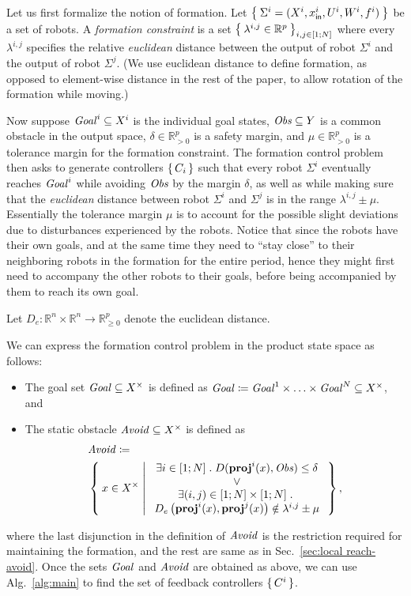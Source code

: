 Let us first formalize the notion of formation.
Let $\Set{\Sigma^i=(X^i,x_{\mathsf{in}}^i,U^i,W^i,f^i)}$ be a set of robots.
A \emph{formation constraint} is a set $\Set{\lambda^{i,j}\in \mathbb{R}^p}_{i,j\in [1;N]}$ where every $\lambda^{i,j}$ specifies the relative \emph{euclidean} distance between the output of robot $\Sigma^i$ and the output of robot $\Sigma^j$.
(We use euclidean distance to define formation, as opposed to element-wise distance in the rest of the paper, to allow rotation of the formation while moving.)

Now suppose $\mathit{Goal}^i\subseteq X^i$ is the individual goal states, $\mathit{Obs}\subseteq Y$ is a common obstacle in the output space, $\delta \in \mathbb{R}^p_{>0}$ is a safety margin, and $\mu\in \mathbb{R}^p_{>0}$ is a tolerance margin for the formation constraint.
The formation control problem then asks to generate controllers $\set{C_i}$ such that every robot $\Sigma^i$ eventually reaches $\mathit{Goal}^i$ while avoiding $\mathit{Obs}$ by the margin $\delta$, as well as while making sure that the \emph{euclidean} distance between robot $\Sigma^i$ and $\Sigma^j$ is in the range $\lambda^{i,j} \pm \mu$.
Essentially the tolerance margin $\mu$ is to account for the possible slight deviations due to disturbances experienced by the robots. Notice that since the robots have their own goals, and at the same time they need to ``stay close'' to their neighboring robots in the formation for the entire period, hence they might first need to accompany the other robots to their goals, before being accompanied by them to reach its own goal.

Let $D_e\colon \mathbb{R}^n\times \mathbb{R}^n\to \mathbb{R}^p_{\geq0}$ denote the euclidean distance.

We can express the formation control problem in the product state space as follows:
\begin{itemize}
	\item The goal set $\mathit{Goal}\subseteq X^\times$ is defined as $\mathit{Goal} \coloneqq \mathit{Goal}^1\times \ldots \times \mathit{Goal}^N \subseteq X^\times$, and
	\item The static obstacle $\mathit{Avoid}\subseteq X^\times$ is defined as 
		\begin{align}
			&\mathit{Avoid} \coloneqq\nonumber\\ 
			&\Set{ x\in X^\times | 
				\begin{array}{c}
					\exists i\in [1;N]\;.\; D(\mathbf{proj}^i(x),\mathit{Obs}) \leq \delta\\
					\vee\\
					\exists (i,j)\in [1;N]\times [1;N]\;.\;\\ D_e\left(\mathbf{proj}^i(x),\mathbf{proj}^j(x)\right)\notin\lambda^{i,j}\pm \mu
			\end{array}},					
		\end{align}
\end{itemize}
where the last disjunction in the definition of $\mathit{Avoid}$ is the restriction required for maintaining the formation, and the rest are same as in Sec.~\ref{sec:local reach-avoid}.
Once the sets $\mathit{Goal}$ and $\mathit{Avoid}$ are obtained as above, we can use Alg.~\ref{alg:main} to find the set of feedback controllers $\set{C^i}$.

